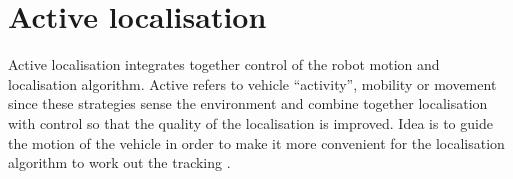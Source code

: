 \section{Active localisation} \label{sec:active-nav}
Active localisation integrates together control of the robot motion and localisation algorithm. Active refers to vehicle ``activity'', mobility or movement since these strategies sense the environment and combine together localisation with control so that the quality of the localisation is improved. Idea is to guide the motion of the vehicle in order to make it more convenient for the localisation algorithm to work out the tracking \cite{petillot10}.
